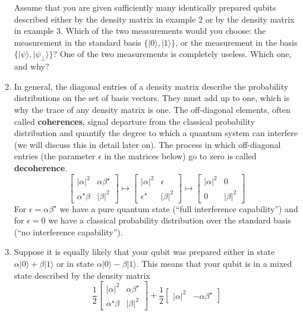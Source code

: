 \documentclass{article}
\begin{document}
\begin{enumerate}
  Assume that you are given sufficiently many identically prepared qubits described either by the density matrix in example 2 or by the density matrix in example 3.
  Which of the two measurements would you choose: the measurement in the standard basis \(\{|0\rangle,|1\rangle\}\), or the measurement in the basis \(\{|\psi\rangle,|\psi_\perp\rangle\}\)?
  One of the two measurements is completely useless.
  Which one, and why?
\item
  In general, the diagonal entries of a density matrix describe the probability distributions on the set of basis vectors.
  They must add up to one, which is why the trace of any density matrix is one.
  The off-diagonal elements, often called \textbf{coherences}, signal departure from the classical probability distribution and quantify the degree to which a quantum system can interfere (we will discuss this in detail later on).
  The process in which off-diagonal entries (the parameter \(\epsilon\) in the matrices below) go to zero is called \textbf{decoherence}.
  \[
     \begin{bmatrix}
       |\alpha|^2 & \alpha\beta^\star
     \\\alpha^\star\beta & |\beta|^2
     \end{bmatrix}
     \mapsto
     \begin{bmatrix}
       |\alpha|^2 & \epsilon
     \\\epsilon^\star & |\beta|^2
     \end{bmatrix}
     \mapsto
     \begin{bmatrix}
       |\alpha|^2 & 0
     \\0 & |\beta|^2
     \end{bmatrix}
   \]
  For \(\epsilon = \alpha\beta^\star\) we have a pure quantum state (``full interference capability'') and for \(\epsilon=0\) we have a classical probability distribution over the standard basis (``no interference capability'').
\item
  Suppose it is equally likely that your qubit was prepared either in state \(\alpha|0\rangle + \beta|1\rangle\) or in state \(\alpha|0\rangle - \beta|1\rangle\).
  This means that your qubit is in a mixed state described by the density matrix
  \[
     \frac12
     \begin{bmatrix}
       |\alpha|^2 & \alpha\beta^\star
     \\\alpha^\star\beta & |\beta|^2
     \end{bmatrix}
     +
     \frac12
     \begin{bmatrix}
       |\alpha|^2 & -\alpha\beta^\star

\end{bmatrix}\]
\end{enumerate}
\end{document}
